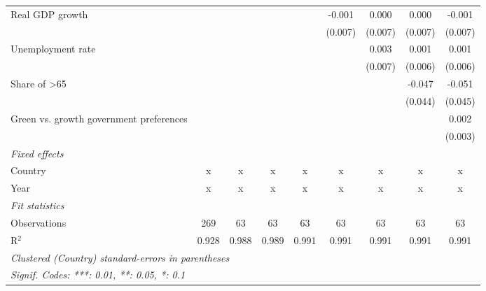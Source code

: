 \begin{table}[htbp]
\begin{tabular}{lcccccccc}
      Real GDP growth                                                  &              &         &             &               & -0.001        & 0.000          & 0.000         & -0.001\\   
                                                                       &              &         &             &               & (0.007)       & (0.007)        & (0.007)       & (0.007)\\   
      Unemployment rate                                                &              &         &             &               &               & 0.003          & 0.001         & 0.001\\   
                                                                       &              &         &             &               &               & (0.007)        & (0.006)       & (0.006)\\   
      Share of >65                                                     &              &         &             &               &               &                & -0.047        & -0.051\\   
                                                                       &              &         &             &               &               &                & (0.044)       & (0.045)\\   
      Green vs. growth government preferences                          &              &         &             &               &               &                &               & 0.002\\   
                                                                       &              &         &             &               &               &                &               & (0.003)\\   
      \emph{Fixed effects}\\
      Country                                                          & x            & x       & x           & x             & x             & x              & x             & x\\  
      Year                                                             & x            & x       & x           & x             & x             & x              & x             & x\\  
      \midrule \emph{Fit statistics}\\
      Observations                                                     & 269          & 63      & 63          & 63            & 63            & 63             & 63            & 63\\  
      R$^2$                                                            & 0.928        & 0.988   & 0.989       & 0.991         & 0.991         & 0.991          & 0.991         & 0.991\\  
      \midrule
      \multicolumn{9}{l}{\emph{Clustered (Country) standard-errors in parentheses}}\\
      \multicolumn{9}{l}{\emph{Signif. Codes: ***: 0.01, **: 0.05, *: 0.1}}\\
   \end{tabular}
\end{table}


